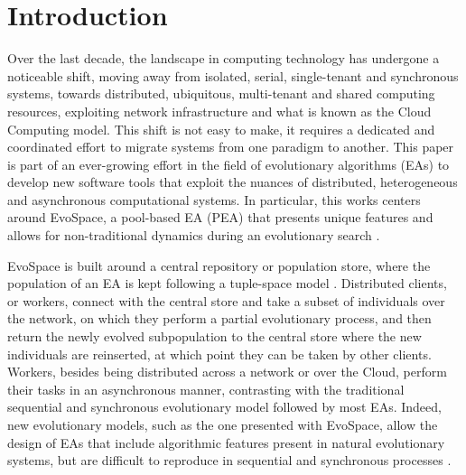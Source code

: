 \section{Introduction}
\label{sec:intro}
Over the last decade,  %
the landscape in computing technology has undergone a noticeable shift, moving away from isolated,
serial, single-tenant and synchronous systems, towards distributed,
ubiquitous, multi-tenant and shared computing resources,
exploiting network infrastructure and what is known as the Cloud Computing model\cite{cloud, varia2008cloud}.
This shift is not easy to make, %
 it requires a dedicated and coordinated effort to migrate systems
 from one paradigm to another. %
This paper is part of an ever-growing effort in the field of evolutionary algorithms (EAs) to develop new software tools that exploit the nuances
of distributed, heterogeneous and asynchronous computational systems.
In particular, this works centers around EvoSpace, a pool-based EA (PEA) that presents unique features and allows for non-traditional dynamics during
an evolutionary search \cite{Evospace}. %

EvoSpace is built around a central repository or population store,
where the population of an EA is kept following a tuple-space model
\cite{linda}.
Distributed clients, or workers, connect with the central store and take a subset of individuals over the network, on which they perform a partial evolutionary
process, and then return the newly evolved subpopulation to the central store where the new individuals are reinserted, at which point they can be taken by other clients.
Workers, besides being distributed across a network or over the Cloud, perform their tasks in an asynchronous manner, contrasting with the traditional
sequential and synchronous evolutionary model followed by most EAs.
Indeed, new evolutionary models, such as the one presented with EvoSpace, allow the design of EAs that include algorithmic features present in natural evolutionary systems, but are difficult to reproduce in sequential and synchronous processes \cite{eiben}.

